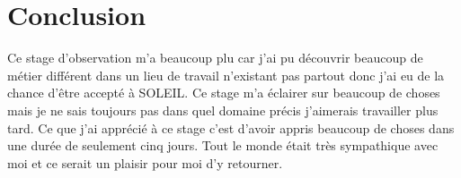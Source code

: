 





			
	\chapter*{Conclusion}
		\minitoc
        Ce stage d'observation m'a beaucoup plu car j'ai pu découvrir beaucoup de métier différent dans un lieu de travail n'existant pas partout donc j'ai eu de la chance d'être accepté à SOLEIL. Ce stage m'a éclairer sur beaucoup de choses mais je ne sais toujours pas dans quel domaine précis j'aimerais travailler plus tard. Ce que j'ai apprécié à ce stage c'est d'avoir appris beaucoup de choses dans une durée de seulement cinq jours.
        Tout le monde était très sympathique avec moi et ce serait un plaisir pour moi d'y retourner.
